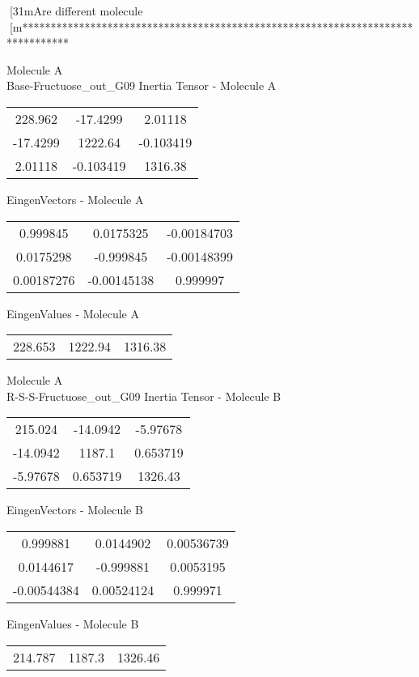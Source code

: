 [31mAre different molecule
[m********************************************************************************
\newpage
\begin{multicols}{2}
\begin{center}
Molecule A \\ 
Base-Fructuose_out_G09
Inertia Tensor - Molecule A \\
\vtab
\begin{tabular}{|c c c|}
228.962	 & 	-17.4299	 & 	2.01118	 \\
-17.4299	 & 	1222.64	 & 	-0.103419	 \\
2.01118	 & 	-0.103419	 & 	1316.38
\end{tabular}

\vtab
 EingenVectors - Molecule A     \\
\vtab
\begin{tabular}{|c c c|}
0.999845	 & 	0.0175325	 & 	-0.00184703	 \\
0.0175298	 & 	-0.999845	 & 	-0.00148399	 \\
0.00187276	 & 	-0.00145138	 & 	0.999997
\end{tabular}

\vtab
 EingenValues - Molecule A     \\
\vtab
\begin{tabular}{|c c c|}
228.653	 & 	1222.94	 & 	1316.38
\end{tabular}
\columnbreak
Molecule A \\ 
R-S-S-Fructuose_out_G09
Inertia Tensor - Molecule B \\
\vtab
\begin{tabular}{|c c c|}
215.024	 & 	-14.0942	 & 	-5.97678	 \\
-14.0942	 & 	1187.1	 & 	0.653719	 \\
-5.97678	 & 	0.653719	 & 	1326.43
\end{tabular}

\vtab
 EingenVectors - Molecule B     \\
\vtab
\begin{tabular}{|c c c|}
0.999881	 & 	0.0144902	 & 	0.00536739	 \\
0.0144617	 & 	-0.999881	 & 	0.0053195	 \\
-0.00544384	 & 	0.00524124	 & 	0.999971
\end{tabular}

\vtab
 EingenValues - Molecule B     \\
\vtab
\begin{tabular}{|c c c|}
214.787	 & 	1187.3	 & 	1326.46
\end{tabular}
\end{center}
\end{multicols}
